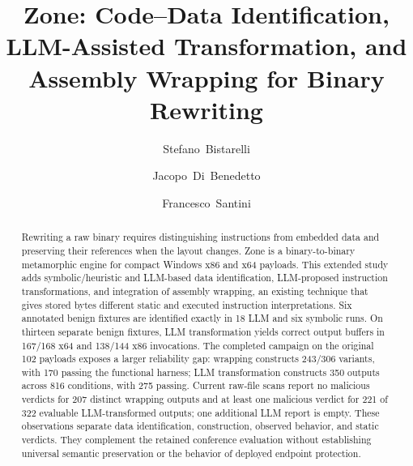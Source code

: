\documentclass[runningheads]{llncs}
\newif\ifworkingdraft
\newcommand{\draftnote}[1]{\ifworkingdraft\par\smallskip\noindent
 {\color{draftblue}\small\textbf{Draft note.} #1}\par\smallskip\fi}
\begin{document}
\title{Zone: Code--Data Identification, LLM-Assisted Transformation, and Assembly Wrapping for Binary Rewriting}
\author{Stefano~Bistarelli \and
Jacopo~Di~Benedetto \and
Francesco~Santini}
\maketitle

\begin{abstract}
Rewriting a raw binary requires distinguishing instructions from embedded
data and preserving their references when the layout changes. Zone is a
binary-to-binary metamorphic engine for compact Windows x86 and x64
payloads. This extended study adds symbolic/heuristic and LLM-based data
identification, LLM-proposed instruction transformations, and integration
of assembly wrapping, an existing technique that gives stored bytes
different static and executed instruction interpretations. Six annotated
benign fixtures are identified exactly in 18 LLM and six symbolic runs.
On thirteen separate benign fixtures, LLM transformation yields correct
output buffers in 167/168 x64 and 138/144 x86 invocations. The completed
campaign on the original 102 payloads exposes a larger reliability gap:
wrapping constructs 243/306 variants, with 170 passing the functional
harness; LLM transformation constructs 350 outputs across 816 conditions,
with 275 passing. Current raw-file scans report no malicious verdicts for
207 distinct wrapping outputs and at least one malicious verdict for
221 of 322 evaluable LLM-transformed outputs; one additional LLM report
is empty. These observations separate data identification, construction,
observed behavior, and static verdicts. They complement the retained
conference evaluation without establishing universal semantic preservation
or the behavior of deployed endpoint protection.
\end{abstract}
\draftnote{The extension uses the completed campaign logs available on
14 November 2026. The current manifest has 549 completed scan records;
548 contain engine responses and one is empty. Earlier experiments retain
their own versions and denominators.}
\end{document}
